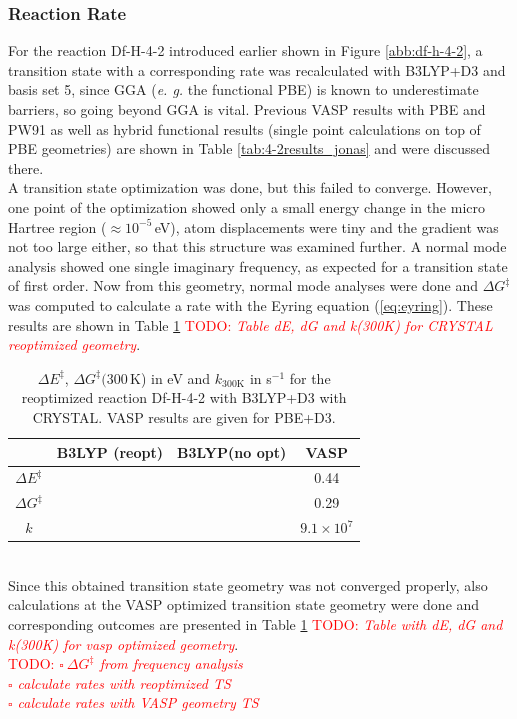 \documentclass[11pt,DIV=13,BCOR=5mm,a4paper,headinclude]{scrbook}
\newcommand\todo[1]{\textcolor{red}{TODO: \textit{{#1}}}}
\begin{document}
\subsubsection{Reaction Rate}
For the reaction Df-H-4-2 introduced earlier shown in Figure \ref{abb:df-h-4-2}, a transition state with a corresponding rate was recalculated with B3LYP+D3 and basis set 5, since GGA (\textit{e. g.} the functional PBE) is known to underestimate barriers\cite{Zhao05}, so going beyond GGA is vital.
Previous VASP results with PBE and PW91 as well as hybrid functional results (single point calculations on top of PBE geometries) are shown in Table \ref{tab:4-2results_jonas} and were discussed there.
\\
A transition state optimization was done, but this failed to converge.
However, one point of the optimization showed only a small energy change in the micro Hartree region ($\approx 10^{-5}\,$eV), atom displacements were tiny and the gradient was not too large either, so that this structure was examined further.
A normal mode analysis showed one single imaginary frequency, as expected for a transition state of first order.
Now from this geometry, normal mode analyses were done and $\Delta G^\ddagger$ was computed to calculate a rate with the Eyring equation (\ref{eq:eyring}).
These results are shown in Table \ref{tab:k_crystal-reopt+noopt} \todo{Table dE, dG and k(300K) for CRYSTAL reoptimized geometry}.
\begin{table}[!h]
  \centering
  \caption{$\Delta E^\ddagger$, $\Delta G^\ddagger(300\,$K) in eV and $k_\textrm{300K}$ in s$^{-1}$ for the reoptimized reaction Df-H-4-2 with B3LYP+D3 with CRYSTAL. VASP results are given for PBE+D3.}
  \begin{tabular}{c|ccc}
  \toprule
   &B3LYP (reopt)&B3LYP(no opt)&VASP\\\midrule
   $\Delta E^\ddagger$ & & &0.44\\
   $\Delta G^\ddagger$ & & &0.29\\
   $k$ & & &$9.1\times 10^7$\\\bottomrule
  \end{tabular}
  \label{tab:k_crystal-reopt+noopt}
\end{table}
\\
Since this obtained transition state geometry was not converged properly, also calculations at the VASP optimized transition state geometry were done and corresponding  outcomes are presented in Table \ref{tab:k_crystal-reopt+noopt} \todo{Table with dE, dG and k(300K) for vasp optimized geometry}.
\\
\todo{
$\square~ \Delta G^\ddagger$ from frequency analysis\\
$\square$ calculate rates with reoptimized TS\\
$\square$ calculate rates with VASP geometry TS
} 
 
\end{document}
